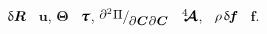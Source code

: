 \noindent {} ${\updelta\hspace{-0.1ex}\bm{R}}$ ~$\bm{u}$, $\bm{\Theta}$ ~$\mathboldtau$, ${\scalebox{0.98}[1]{$\raisemath{0.16em}{\scalebox{0.92}[0.92]{$\partial^2 \hspace{0.1ex} \Pi$}} / \hspace{-0.1ex} \raisemath{-0.32em}{\scalebox{0.92}[0.92]{$\partial \hspace{0.1ex} \bm{C} \hspace{0.1ex} \partial \hspace{0.1ex} \bm{C}$}}\hspace{0.12ex}$}}$ ~$\hspace{.08ex}{^4\hspace{-0.72ex}\bm{\mathcal{A}}}\hspace{.08ex}$, ~${\rho \hspace{.25ex} \variation{\hspace{-0.2ex}\bm{f}}}$ ~$\bm{f}$\hspace{-0.2ex}.

